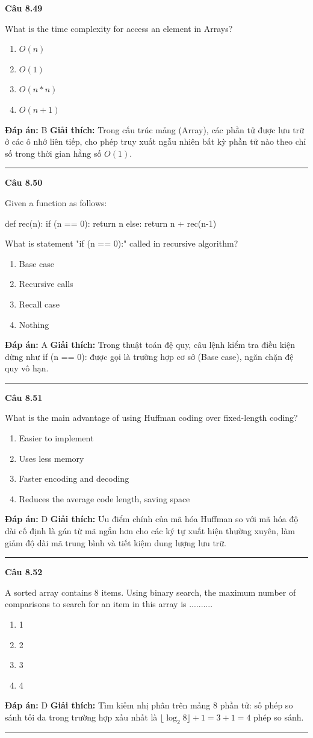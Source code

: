 \documentclass[11pt,a4paper]{article}
\newenvironment{question}[1]{%
  \par\vspace{1em}\noindent\textbf{\large Câu #1}\par\vspace{0.4em}
}{%
  \par\vspace{1em}\hrule\vspace{0.6em}
}
\newenvironment{choices}{%
  \begin{enumerate}[label=\textbf{\Alph*.},leftmargin=2.2em,itemsep=2pt,topsep=3pt]
}{%
  \end{enumerate}
}
\newcommand{\choice}{\item}
\newenvironment{codebox}{%
  \begin{tcolorbox}[colback=gray!8!white,colframe=gray!50!black,arc=1.5mm,boxrule=0.6pt,left=3mm,right=3mm,top=2.5mm,bottom=2.5mm]
  \ttfamily\small
}{%
  \end{tcolorbox}
}
\begin{document}
\begin{question}{8.49}
What is the time complexity for access an element in Arrays?
\begin{choices}
\choice \(O(n)\)
\choice \(O(1)\)
\choice \(O(n * n)\)
\choice \(O(n + 1)\)
\end{choices}
\textbf{Đáp án:} B
\textbf{Giải thích:} Trong cấu trúc mảng (Array), các phần tử được lưu trữ ở các ô nhớ liên tiếp, cho phép truy xuất ngẫu nhiên bất kỳ phần tử nào theo chỉ số trong thời gian hằng số \(O(1)\).
\end{question}

\begin{question}{8.50}
Given a function as follows:
\begin{codebox}
def rec(n):
    if (n == 0):
        return n
    else:
        return n + rec(n-1)
\end{codebox}
What is statement "if (n == 0):" called in recursive algorithm?
\begin{choices}
\choice Base case
\choice Recursive calls
\choice Recall case
\choice Nothing
\end{choices}
\textbf{Đáp án:} A
\textbf{Giải thích:} Trong thuật toán đệ quy, câu lệnh kiểm tra điều kiện dừng như if (n == 0): được gọi là trường hợp cơ sở (Base case), ngăn chặn đệ quy vô hạn.
\end{question}

\begin{question}{8.51}
What is the main advantage of using Huffman coding over fixed-length coding?
\begin{choices}
\choice Easier to implement
\choice Uses less memory
\choice Faster encoding and decoding
\choice Reduces the average code length, saving space
\end{choices}
\textbf{Đáp án:} D
\textbf{Giải thích:} Ưu điểm chính của mã hóa Huffman so với mã hóa độ dài cố định là gán từ mã ngắn hơn cho các ký tự xuất hiện thường xuyên, làm giảm độ dài mã trung bình và tiết kiệm dung lượng lưu trữ.
\end{question}

\begin{question}{8.52}
A sorted array contains 8 items. Using binary search, the maximum number of comparisons to search for an item in this array is ..........
\begin{choices}
\choice 1
\choice 2
\choice 3
\choice 4
\end{choices}
\textbf{Đáp án:} D
\textbf{Giải thích:} Tìm kiếm nhị phân trên mảng 8 phần tử: số phép so sánh tối đa trong trường hợp xấu nhất là \(\lfloor\log_2 8\rfloor + 1 = 3 + 1 = 4\) phép so sánh.
\end{question}
\end{document}
